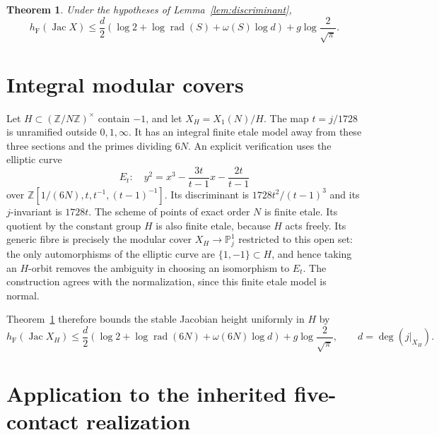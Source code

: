 \documentclass[11pt]{article}
\newtheorem{theorem}{Theorem}
\newcommand{\Z}{\mathbb Z}
\newcommand{\hF}{h_{\mathrm F}}
\begin{document}
\begin{theorem}\label{thm:coverheight}
Under the hypotheses of Lemma~\ref{lem:discriminant},
\[
 \hF(\operatorname{Jac}X)
 \leq\frac d2\left(\log2+\log\operatorname{rad}(S)
              +\omega(S)\log d\right)
       +g\log\frac2{\sqrt\pi}.
\]
\end{theorem}

\section{Integral modular covers}

Let $H\subset(\Z/N\Z)^\times$ contain $-1$, and let
$X_H=X_1(N)/H$. The map $t=j/1728$ is unramified outside
$0,1,\infty$. It has an integral finite etale model away from
these three sections and the primes dividing $6N$. An explicit
verification uses the elliptic curve
\[
 E_t:\quad y^2=x^3-\frac{3t}{t-1}x-\frac{2t}{t-1}
\]
over $\Z[1/(6N),t,t^{-1},(t-1)^{-1}]$. Its discriminant is
$1728t^2/(t-1)^3$ and its $j$-invariant is $1728t$.
The scheme of points of exact order $N$ is finite etale. Its
quotient by the constant group $H$ is also finite etale, because
$H$ acts freely. Its generic fibre is precisely the modular cover
$X_H\to\mathbb P^1_j$ restricted to this open set: the only
automorphisms of the elliptic curve are $\{1,-1\}\subset H$,
and hence taking an $H$-orbit removes the ambiguity in choosing an
isomorphism to $E_t$. The construction agrees with the
normalization, since this finite etale model is normal.

Theorem~\ref{thm:coverheight} therefore bounds the stable Jacobian
height uniformly in $H$ by
\[
 \hF(\operatorname{Jac}X_H)
 \leq\frac d2\left(\log2+\log\operatorname{rad}(6N)
              +\omega(6N)\log d\right)+g\log\frac2{\sqrt\pi},
 \qquad d=\deg(j|_{X_H}).
\]

\section{Application to the inherited five-contact realization}
\end{document}
